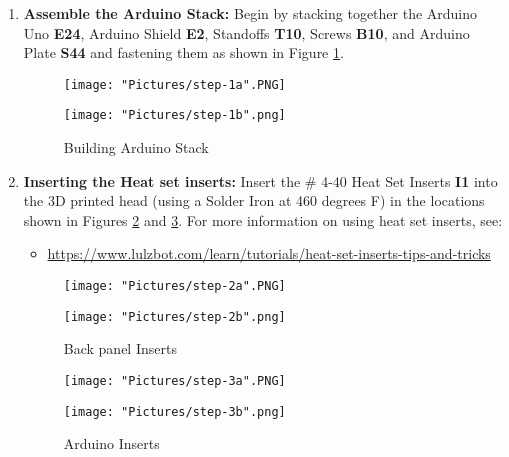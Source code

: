 \documentclass{article}
\begin{document}
\begin{enumerate}

\item \textbf{Assemble the Arduino Stack:} Begin by stacking together the Arduino Uno \textbf{E24}, Arduino Shield \textbf{E2}, Standoffs \textbf{T10}, Screws \textbf{B10}, and Arduino Plate \textbf{S44} and fastening them as shown in Figure \ref{arduino_stack}. 

\begin{figure}[H]
	\centering
  	\begin{minipage}[b]{0.45\textwidth}
		\texttt{[image: "Pictures/step-1a".PNG]}
  	\end{minipage}
  	\hfill
  	\begin{minipage}[b]{0.45\textwidth}
    	\texttt{[image: "Pictures/step-1b".png]}
	\end{minipage}
	\caption{Building Arduino Stack}
	\label{arduino_stack}
\end{figure}


\item \textbf{Inserting the Heat set inserts:} Insert the \# 4-40 Heat Set Inserts \textbf{I1} into the 3D printed head (using a Solder Iron at 460 degrees F) in the locations shown in Figures \ref{back_panel_inserts} and \ref{arduino_inserts}.  For more information on using heat set inserts, see:
\begin{itemize}
	\item \href{https://www.lulzbot.com/learn/tutorials/heat-set-inserts-tips-and-tricks}{https://www.lulzbot.com/learn/tutorials/heat-set-inserts-tips-and-tricks}
\end{itemize}

\begin{figure}[H]
	\centering
  	\begin{minipage}[b]{0.45\textwidth}
		\texttt{[image: "Pictures/step-2a".PNG]}
  	\end{minipage}
  	\hfill
  	\begin{minipage}[b]{0.45\textwidth}
    		\texttt{[image: "Pictures/step-2b".png]}
  	\end{minipage}
	\caption{Back panel Inserts}
	\label{back_panel_inserts}
\end{figure}

\begin{figure}[H]
	\centering
  	\begin{minipage}[b]{0.45\textwidth}
		\texttt{[image: "Pictures/step-3a".PNG]}
  	\end{minipage}
  	\hfill
  	\begin{minipage}[b]{0.45\textwidth}
    		\texttt{[image: "Pictures/step-3b".png]}
  	\end{minipage}
	\caption{Arduino Inserts}
	\label{arduino_inserts}
\end{figure}


\end{enumerate}
\end{document}
